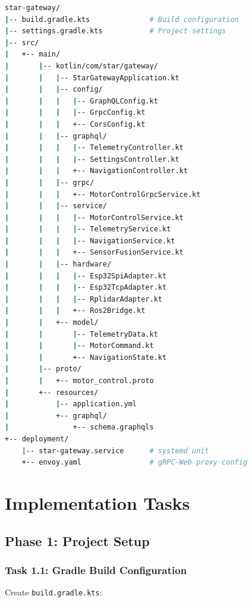 \begin{lstlisting}[language=bash]
star-gateway/
|-- build.gradle.kts              # Build configuration
|-- settings.gradle.kts           # Project settings
|-- src/
|   +-- main/
|       |-- kotlin/com/star/gateway/
|       |   |-- StarGatewayApplication.kt
|       |   |-- config/
|       |   |   |-- GraphQLConfig.kt
|       |   |   |-- GrpcConfig.kt
|       |   |   +-- CorsConfig.kt
|       |   |-- graphql/
|       |   |   |-- TelemetryController.kt
|       |   |   |-- SettingsController.kt
|       |   |   +-- NavigationController.kt
|       |   |-- grpc/
|       |   |   +-- MotorControlGrpcService.kt
|       |   |-- service/
|       |   |   |-- MotorControlService.kt
|       |   |   |-- TelemetryService.kt
|       |   |   |-- NavigationService.kt
|       |   |   +-- SensorFusionService.kt
|       |   |-- hardware/
|       |   |   |-- Esp32SpiAdapter.kt
|       |   |   |-- Esp32TcpAdapter.kt
|       |   |   |-- RplidarAdapter.kt
|       |   |   +-- Ros2Bridge.kt
|       |   +-- model/
|       |       |-- TelemetryData.kt
|       |       |-- MotorCommand.kt
|       |       +-- NavigationState.kt
|       |-- proto/
|       |   +-- motor_control.proto
|       +-- resources/
|           |-- application.yml
|           +-- graphql/
|               +-- schema.graphqls
+-- deployment/
    |-- star-gateway.service      # systemd unit
    +-- envoy.yaml                # gRPC-Web proxy config
\end{lstlisting}

\section{Implementation Tasks}

\subsection{Phase 1: Project Setup}

\subsubsection{Task 1.1: Gradle Build Configuration}

Create \texttt{build.gradle.kts}:

